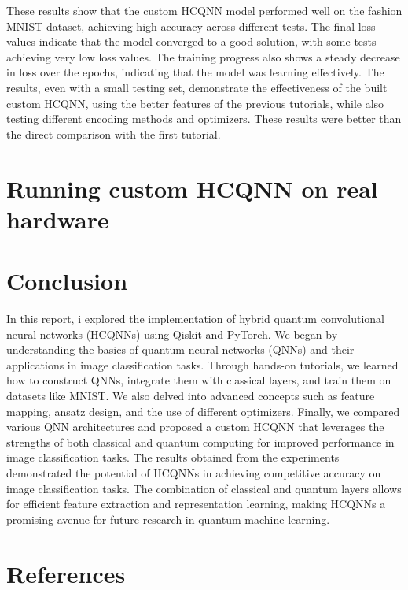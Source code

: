 \documentclass[conference]{IEEEtran}
\begin{document}
\begin{table}[ht]
\centering
{}
\caption{accuracy and final loss of the tests}
\end{table}


These results show that the custom HCQNN model performed well on the fashion MNIST dataset, achieving high accuracy across different tests. The final loss values indicate that the model converged to a good solution, with some tests achieving very low loss values. The training progress also shows a steady decrease in loss over the epochs, indicating that the model was learning effectively.
The results, even with a small testing set, demonstrate the effectiveness of the built custom HCQNN, using the better features of the previous tutorials, while also testing different encoding methods and optimizers. These results were better than the direct comparison with the first tutorial.




\section*{\fontsize{16}{20}\selectfont Running custom HCQNN on real hardware}

\section*{\fontsize{16}{20}\selectfont Conclusion}

In this report, i explored the implementation of hybrid quantum convolutional neural networks (HCQNNs) using Qiskit and PyTorch. We began by understanding the basics of quantum neural networks (QNNs) and their applications in image classification tasks. Through hands-on tutorials, we learned how to construct QNNs, integrate them with classical layers, and train them on datasets like MNIST. We also delved into advanced concepts such as feature mapping, ansatz design, and the use of different optimizers. Finally, we compared various QNN architectures and proposed a custom HCQNN that leverages the strengths of both classical and quantum computing for improved performance in image classification tasks.
The results obtained from the experiments demonstrated the potential of HCQNNs in achieving competitive accuracy on image classification tasks. The combination of classical and quantum layers allows for efficient feature extraction and representation learning, making HCQNNs a promising avenue for future research in quantum machine learning.



\section*{\fontsize{16}{20}\selectfont References}





\end{document}
